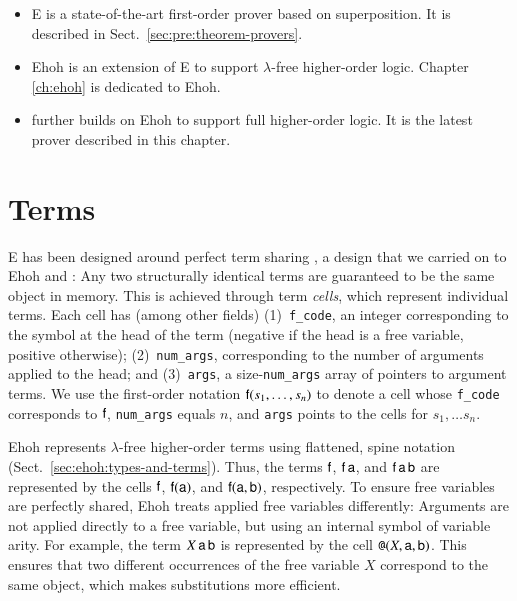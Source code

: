 \begin{itemize}
  \item E is a state-of-the-art first-order prover based on superposition. It is described in
  Sect.~\ref{sec:pre:theorem-provers}.
  \item Ehoh is an extension of E to support $\lambda$-free higher-order logic. Chapter \ref{ch:ehoh}
  is dedicated to Ehoh.
  \item \ehohii{} further builds on Ehoh to support full higher-order logic. It is the latest prover
  described in this chapter.
\end{itemize}

\section{Terms}
\label{sec:ehoh2:terms}

E has been designed around perfect term sharing %
\cite{ls-01-shared}, a design that we carried on to  Ehoh and \ehohii{}: Any two structurally identical terms are
guaranteed to be the same object in memory. This is achieved through term
\emph{cells}, which represent individual terms. Each cell has (among other fields)
(1)~\texttt{f\_code}, an integer corresponding to the symbol at the head of the term (negative
if the head is a free variable, positive otherwise); (2)~\texttt{num\_args},
corresponding to the number of arguments applied to the head; and (3)~\texttt{args},
a size-\texttt{num\_args} array of pointers to argument terms. We
use the first-order notation $\mathsf{f}(s_1, \ldots, s_n)$ to denote a cell whose
\texttt{f\_code} corresponds to $\mathsf{f}$, \texttt{num\_args} equals $n$, and
\texttt{args} points to the cells for $s_1, \ldots s_n$.

Ehoh represents $\lambda$-free higher-order terms using flattened, spine notation
(Sect.~\ref{sec:ehoh:types-and-terms}).
Thus, the terms $\mathsf{f}$, $\mathsf{f} \, \mathsf{a}$, and $\mathsf{f} \, \mathsf{a} \,
\mathsf{b}$ are represented by the cells $\mathsf{f}$,
$\mathsf{f}(\mathsf{a})$, and $\mathsf{f}(\mathsf{a}, \mathsf{b})$, respectively.
To ensure free variables are
perfectly shared, Ehoh treats applied free variables differently: Arguments are
not applied directly to a free variable, but using an internal symbol
\internalat{} of variable arity. For example, the term $X \, \mathsf{a} \, \mathsf{b}$ is
represented by the cell $\texttt{@}(X, \mathsf{a}, \mathsf{b})$. This ensures that
two different occurrences of the free variable $X$ correspond to the same object,
which makes substitutions more efficient.

